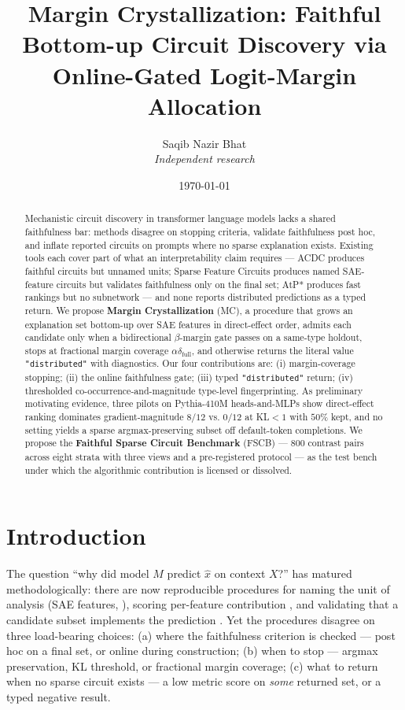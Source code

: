 \documentclass[10pt]{article}
\title{Margin Crystallization: Faithful Bottom-up Circuit Discovery via Online-Gated Logit-Margin Allocation}
\author{Saqib Nazir Bhat \\ \textit{Independent research}}
\date{\today}
\begin{document}
\maketitle

\begin{abstract}
Mechanistic circuit discovery in transformer language models lacks a shared faithfulness bar: methods disagree on stopping criteria, validate faithfulness post hoc, and inflate reported circuits on prompts where no sparse explanation exists. Existing tools each cover part of what an interpretability claim requires --- ACDC \citep{conmy2023acdc} produces faithful circuits but unnamed units; Sparse Feature Circuits \citep{marks2024sparse} produces named SAE-feature circuits but validates faithfulness only on the final set; AtP* \citep{kramar2024atp} produces fast rankings but no subnetwork --- and none reports distributed predictions as a typed return. We propose \textbf{Margin Crystallization} (MC), a procedure that grows an explanation set bottom-up over SAE features in direct-effect order, admits each candidate only when a bidirectional $\beta$-margin gate passes on a same-type holdout, stops at fractional margin coverage $\alpha\delta_{\text{full}}$, and otherwise returns the literal value \texttt{"distributed"} with diagnostics. Our four contributions are: (i) margin-coverage stopping; (ii) the online faithfulness gate; (iii) typed \texttt{"distributed"} return; (iv) thresholded co-occurrence-and-magnitude type-level fingerprinting. As preliminary motivating evidence, three pilots on Pythia-410M heads-and-MLPs show direct-effect ranking dominates gradient-magnitude $8/12$ vs. $0/12$ at KL$<1$ with $50\%$ kept, and no setting yields a sparse argmax-preserving subset off default-token completions. We propose the \textbf{Faithful Sparse Circuit Benchmark} (FSCB) --- 800 contrast pairs across eight strata with three views and a pre-registered protocol --- as the test bench under which the algorithmic contribution is licensed or dissolved.
\end{abstract}

\section{Introduction}
\label{sec:intro}

The question ``why did model $M$ predict $\hat x$ on context $X$?'' has matured methodologically: there are now reproducible procedures for naming the unit of analysis (SAE features, \citealp{bricken2023monosemanticity,templeton2024scaling,lieberum2024gemma}), scoring per-feature contribution \citep{nanda2023attribution,syed2024attribution,kramar2024atp}, and validating that a candidate subset implements the prediction \citep{wang2022interpretability,heimersheim2024patching,hanna2024faithfulness}. Yet the procedures disagree on three load-bearing choices: (a) where the faithfulness criterion is checked --- post hoc on a final set, or online during construction; (b) when to stop --- argmax preservation, KL threshold, or fractional margin coverage; (c) what to return when no sparse circuit exists --- a low metric score on \emph{some} returned set, or a typed negative result.
\end{document}

